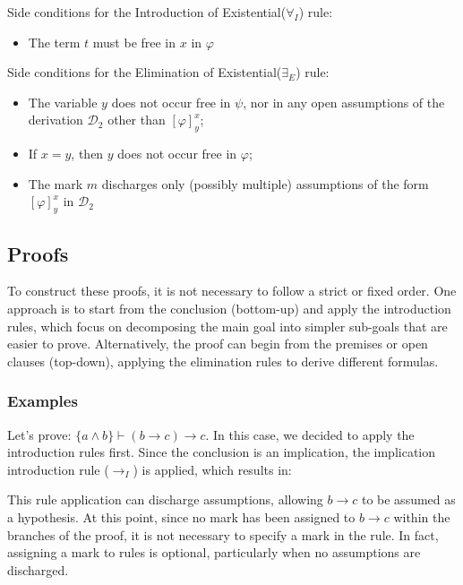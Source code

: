 \vspace{0.5cm}

Side conditions for the Introduction of Existential(\(\forall_I\)) rule:
\begin{itemize}[noitemsep]
  \item The term \(t\) must be free in \(x\) in \(\varphi\)
\end{itemize}

Side conditions for the Elimination of Existential(\(\exists_E\)) rule:
\begin{itemize}[noitemsep]
  \item The variable \(y\) does not occur free in \(\psi\), nor in any open assumptions of the derivation \(\mathcal{D}_2\) other than \([\varphi]^x_y\);
  \item If \(x = y\), then \(y\) does not occur free in \(\varphi\);
  \item The mark \(m\) discharges only (possibly multiple) assumptions of the form \([\varphi]^x_y\) in \(\mathcal{D}_2\)
\end{itemize}


\subsection{Proofs}

To construct these proofs, it is not necessary to follow a strict or fixed order. One approach is to start from the conclusion (bottom-up) and apply the introduction rules, which focus on decomposing the main goal into simpler sub-goals that are easier to prove. Alternatively, the proof can begin from the premises or open clauses (top-down), applying the elimination rules to derive different formulas.

\subsubsection*{Examples}
Let's prove: \(\{a \land b\} \vdash (b \to c) \to c\). In this case, we decided to apply the introduction rules first. Since the conclusion is an implication, the implication introduction rule (\(\to_I\)) is applied, which results in:

\begin{prooftree}
\end{prooftree}

This rule application can discharge assumptions, allowing \(b \to c\) to be assumed as a hypothesis. At this point, since no mark has been assigned to \(b \to c\) within the branches of the proof, it is not necessary to specify a mark in the rule. In fact, assigning a mark to rules is optional, particularly when no assumptions are discharged.

